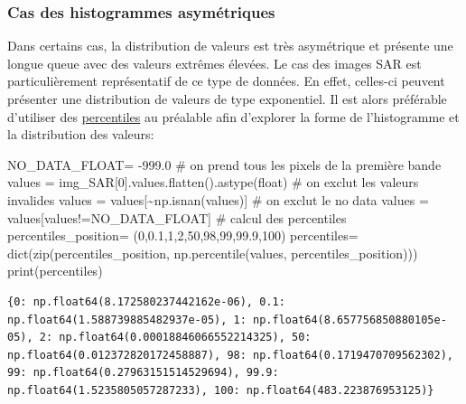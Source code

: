 \documentclass[
  11pt,
  letterpaper,
  open=any,
  twoside=false,
  french]{scrbook}
\newenvironment{Shaded}{\begin{snugshade}}{\end{snugshade}}
\newcommand{\BuiltInTok}[1]{\textcolor[rgb]{0.00,0.23,0.31}{#1}}
\newcommand{\CommentTok}[1]{\textcolor[rgb]{0.37,0.37,0.37}{#1}}
\newcommand{\DecValTok}[1]{\textcolor[rgb]{0.68,0.00,0.00}{#1}}
\newcommand{\FloatTok}[1]{\textcolor[rgb]{0.68,0.00,0.00}{#1}}
\newcommand{\NormalTok}[1]{\textcolor[rgb]{0.00,0.23,0.31}{#1}}
\newcommand{\OperatorTok}[1]{\textcolor[rgb]{0.37,0.37,0.37}{#1}}
\begin{document}
\subsubsection{Cas des histogrammes
asymétriques}\label{cas-des-histogrammes-asymuxe9triques}

Dans certains cas, la distribution de valeurs est très asymétrique et
présente une longue queue avec des valeurs extrêmes élevées. Le cas des
images SAR est particulièrement représentatif de ce type de données. En
effet, celles-ci peuvent présenter une distribution de valeurs de type
exponentiel. Il est alors préférable d'utiliser des
\href{https://fr.wikipedia.org/wiki/Centile}{percentiles} au préalable
afin d'explorer la forme de l'histogramme et la distribution des
valeurs:

\begin{Shaded}
\begin{Highlighting}[]
\NormalTok{NO\_DATA\_FLOAT}\OperatorTok{=} \OperatorTok{{-}}\FloatTok{999.0}
\CommentTok{\# on prend tous les pixels de la première bande}
\NormalTok{values }\OperatorTok{=}\NormalTok{ img\_SAR[}\DecValTok{0}\NormalTok{].values.flatten().astype(}\BuiltInTok{float}\NormalTok{)}
\CommentTok{\# on exclut les valeurs invalides}
\NormalTok{values }\OperatorTok{=}\NormalTok{ values[}\OperatorTok{\textasciitilde{}}\NormalTok{np.isnan(values)]}
\CommentTok{\# on exclut le no data}
\NormalTok{values }\OperatorTok{=}\NormalTok{ values[values}\OperatorTok{!=}\NormalTok{NO\_DATA\_FLOAT]}
\CommentTok{\# calcul des percentiles}
\NormalTok{percentiles\_position}\OperatorTok{=}\NormalTok{ (}\DecValTok{0}\NormalTok{,}\FloatTok{0.1}\NormalTok{,}\DecValTok{1}\NormalTok{,}\DecValTok{2}\NormalTok{,}\DecValTok{50}\NormalTok{,}\DecValTok{98}\NormalTok{,}\DecValTok{99}\NormalTok{,}\FloatTok{99.9}\NormalTok{,}\DecValTok{100}\NormalTok{)}
\NormalTok{percentiles}\OperatorTok{=} \BuiltInTok{dict}\NormalTok{(}\BuiltInTok{zip}\NormalTok{(percentiles\_position, np.percentile(values, percentiles\_position)))}
\BuiltInTok{print}\NormalTok{(percentiles)}
\end{Highlighting}
\end{Shaded}

\begin{verbatim}
{0: np.float64(8.172580237442162e-06), 0.1: np.float64(1.588739885482937e-05), 1: np.float64(8.657756850880105e-05), 2: np.float64(0.00018846066552214325), 50: np.float64(0.012372820172458887), 98: np.float64(0.1719470709562302), 99: np.float64(0.27963151514529694), 99.9: np.float64(1.5235805057287233), 100: np.float64(483.223876953125)}
\end{verbatim}
\end{document}
